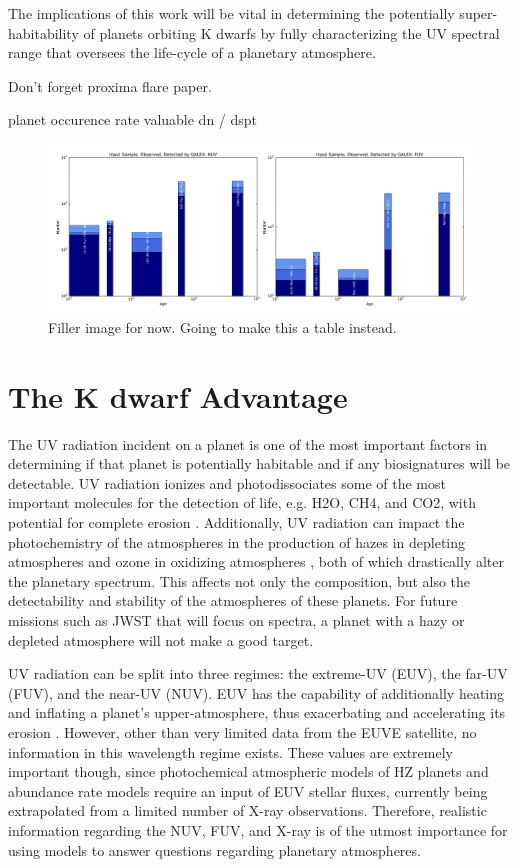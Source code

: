 \documentclass[twocolumn]{aastex62}
\begin{document}
The implications of this work will be vital in determining the potentially super-habitability of planets orbiting K dwarfs by fully characterizing the UV spectral range that oversees the life-cycle of a planetary atmosphere.

Don't forget proxima flare paper.


planet occurence rate valuable
dn / dspt

\begin{figure}[th]
\includegraphics[width=\linewidth]{galex_observations.pdf}
\caption{Filler image for now. Going to make this a table instead. \label{fig:galex_observations}}
\end{figure}

\section{The K dwarf Advantage}\label{sec:advantage}

The UV radiation incident on a planet is one of the most important factors in determining if that planet is potentially habitable and if any biosignatures will be detectable. UV radiation ionizes and photodissociates some of the most important molecules for the detection of life, e.g. H2O, CH4, and CO2, with potential for complete erosion \citep[e.g.][]{Kasting1993, Lichtenegger2010, Segura2010, Hu2012}. Additionally, UV radiation can impact the photochemistry of the atmospheres in the production of hazes in depleting atmospheres \citep{Zerkle2012, Arney2017}
and ozone in oxidizing atmospheres \citep{Segura2003, Segura2005}, both of which drastically alter the planetary spectrum. This affects not only the composition, but also the detectability and stability of the atmospheres of these planets. For future missions such as JWST that will focus on spectra, a planet with a hazy or depleted atmosphere will not make a good target.

UV radiation can be split into three regimes: the extreme-UV (EUV), the far-UV (FUV), and the near-UV (NUV). EUV has the capability of additionally heating and inflating a planet’s upper-atmosphere, thus exacerbating and accelerating its erosion \citep{Koskinen2010, Lammer2007}. However, other than very limited data from the EUVE satellite, no information in this wavelength regime exists. These values are extremely important though, since photochemical atmospheric models of HZ planets and abundance rate models require an input of EUV stellar fluxes, currently being extrapolated from a limited number of X-ray observations. Therefore, realistic information regarding the NUV, FUV, and X-ray is of the utmost importance for using models to answer questions regarding planetary atmospheres. 
\end{document}
